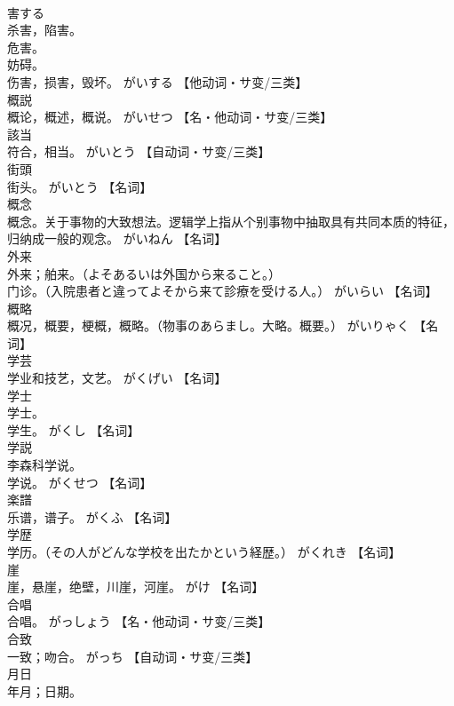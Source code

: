 \documentclass[8pt]{extreport}
\begin{document}
\begin{CJK}{UTF8}{min}
\\	害する	
\\	杀害，陷害。 
\\	危害。 
\\	妨碍。 
\\	伤害，损害，毁坏。	がいする		【他动词・サ变/三类】
\\	概説	
\\	概论，概述，概说。	がいせつ		【名・他动词・サ变/三类】
\\	該当	
\\	符合，相当。	がいとう		【自动词・サ变/三类】
\\	街頭	
\\	街头。	がいとう		【名词】
\\	概念	
\\	概念。关于事物的大致想法。逻辑学上指从个别事物中抽取具有共同本质的特征，归纳成一般的观念。	がいねん		【名词】
\\	外来	
\\	外来；舶来。（よそあるいは外国から来ること。） 
\\	门诊。（入院患者と違ってよそから来て診療を受ける人。）	がいらい		【名词】
\\	概略	
\\	概况，概要，梗概，概略。（物事のあらまし。大略。概要。）	がいりゃく		【名词】
\\	学芸	
\\	学业和技艺，文艺。	がくげい		【名词】
\\	学士	
\\	学士。 
\\	学生。	がくし		【名词】
\\	学説	
\\	李森科学说。 
\\	学说。	がくせつ		【名词】
\\	楽譜	
\\	乐谱，谱子。	がくふ		【名词】
\\	学歴	
\\	学历。（その人がどんな学校を出たかという経歴。）	がくれき		【名词】
\\	崖	
\\	崖，悬崖，绝壁，川崖，河崖。	がけ		【名词】
\\	合唱	
\\	合唱。	がっしょう		【名・他动词・サ变/三类】
\\	合致	
\\	一致；吻合。	がっち		【自动词・サ变/三类】
\\	月日	
\\	年月；日期。 

\end{CJK}
\end{document}
